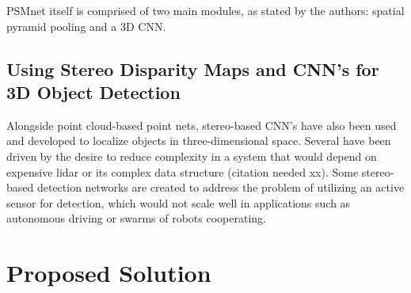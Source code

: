 PSMnet itself is comprised of two main modules, as stated by the authors: spatial pyramid pooling and a 3D CNN. 


%
%

\subsection{Using Stereo Disparity Maps and CNN's for 3D Object Detection}
%



Alongside point cloud-based point nets, stereo-based CNN's have also been used and developed to localize objects in three-dimensional space. Several have been driven by the desire to reduce complexity in a system that would depend on expensive lidar or its complex data structure (citation needed xx). Some stereo-based detection networks are created to address the problem of utilizing an active sensor for detection, which would not scale well in applications such as autonomous driving or swarms of robots cooperating.

\section{Proposed Solution}

